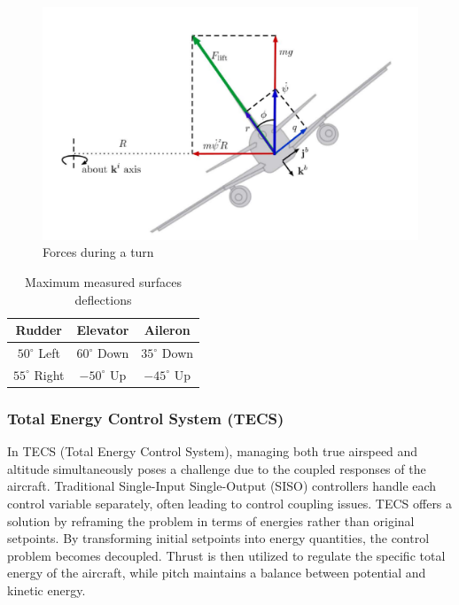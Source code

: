 \begin{figure}[h]
    \centering
    \includegraphics[width=0.9\linewidth]{Images/Forces during a turn, from [35].png}
    \caption{Forces during a turn}
    \label{fig:Forces during a turn}
\end{figure}

\begin{table}[h]
    \centering
    \begin{tabular}{ccc}
    \hline
        Rudder & Elevator & Aileron \\
    \hline
        \(50^\circ\) Left & \(60^\circ\) Down & \(35^\circ\) Down \\
        \(55^\circ\) Right & \(-50^\circ\) Up & \(-45^\circ\) Up \\
    \hline
    \end{tabular}
    \caption{Maximum measured surfaces deflections}
    \label{tab:Maximum measured surfaces deflections.}
\end{table}

\subsubsection{Total Energy Control System (TECS)}
In TECS (Total Energy Control System), managing both true airspeed and altitude simultaneously poses a challenge due to the coupled responses of the aircraft. Traditional Single-Input Single-Output (SISO) controllers handle each control variable separately, often leading to control coupling issues. TECS offers a solution by reframing the problem in terms of energies rather than original setpoints. By transforming initial setpoints into energy quantities, the control problem becomes decoupled. Thrust is then utilized to regulate the specific total energy of the aircraft, while pitch maintains a balance between potential and kinetic energy.

